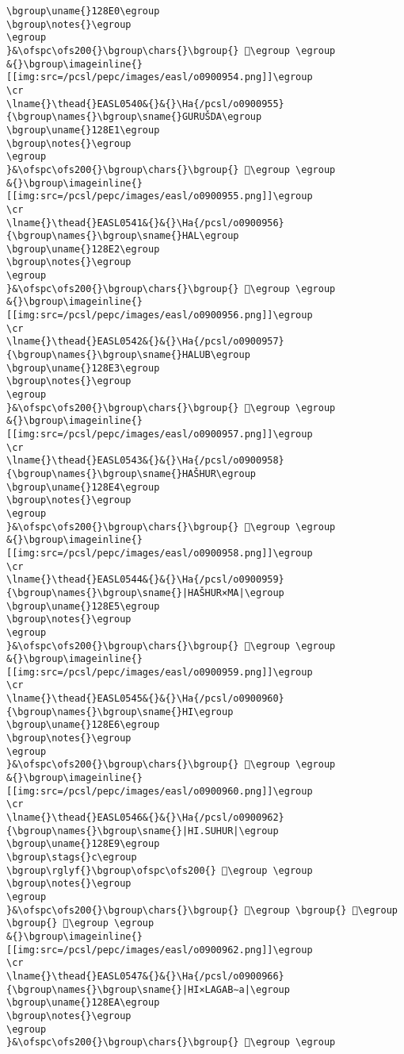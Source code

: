 \begin{verbatim}
\bgroup\uname{}128E0\egroup
\bgroup\notes{}\egroup
\egroup
}&\ofspc\ofs200{}\bgroup\chars{}\bgroup{} 𒣠\egroup \egroup
&{}\bgroup\imageinline{}[[img:src=/pcsl/pepc/images/easl/o0900954.png]]\egroup
\cr
\lname{}\thead{}EASL0540&{}&{}\Ha{/pcsl/o0900955}{\bgroup\names{}\bgroup\sname{}GURUŠDA\egroup
\bgroup\uname{}128E1\egroup
\bgroup\notes{}\egroup
\egroup
}&\ofspc\ofs200{}\bgroup\chars{}\bgroup{} 𒣡\egroup \egroup
&{}\bgroup\imageinline{}[[img:src=/pcsl/pepc/images/easl/o0900955.png]]\egroup
\cr
\lname{}\thead{}EASL0541&{}&{}\Ha{/pcsl/o0900956}{\bgroup\names{}\bgroup\sname{}HAL\egroup
\bgroup\uname{}128E2\egroup
\bgroup\notes{}\egroup
\egroup
}&\ofspc\ofs200{}\bgroup\chars{}\bgroup{} 𒣢\egroup \egroup
&{}\bgroup\imageinline{}[[img:src=/pcsl/pepc/images/easl/o0900956.png]]\egroup
\cr
\lname{}\thead{}EASL0542&{}&{}\Ha{/pcsl/o0900957}{\bgroup\names{}\bgroup\sname{}HALUB\egroup
\bgroup\uname{}128E3\egroup
\bgroup\notes{}\egroup
\egroup
}&\ofspc\ofs200{}\bgroup\chars{}\bgroup{} 𒣣\egroup \egroup
&{}\bgroup\imageinline{}[[img:src=/pcsl/pepc/images/easl/o0900957.png]]\egroup
\cr
\lname{}\thead{}EASL0543&{}&{}\Ha{/pcsl/o0900958}{\bgroup\names{}\bgroup\sname{}HAŠHUR\egroup
\bgroup\uname{}128E4\egroup
\bgroup\notes{}\egroup
\egroup
}&\ofspc\ofs200{}\bgroup\chars{}\bgroup{} 𒣤\egroup \egroup
&{}\bgroup\imageinline{}[[img:src=/pcsl/pepc/images/easl/o0900958.png]]\egroup
\cr
\lname{}\thead{}EASL0544&{}&{}\Ha{/pcsl/o0900959}{\bgroup\names{}\bgroup\sname{}|HAŠHUR×MA|\egroup
\bgroup\uname{}128E5\egroup
\bgroup\notes{}\egroup
\egroup
}&\ofspc\ofs200{}\bgroup\chars{}\bgroup{} 𒣥\egroup \egroup
&{}\bgroup\imageinline{}[[img:src=/pcsl/pepc/images/easl/o0900959.png]]\egroup
\cr
\lname{}\thead{}EASL0545&{}&{}\Ha{/pcsl/o0900960}{\bgroup\names{}\bgroup\sname{}HI\egroup
\bgroup\uname{}128E6\egroup
\bgroup\notes{}\egroup
\egroup
}&\ofspc\ofs200{}\bgroup\chars{}\bgroup{} 𒣦\egroup \egroup
&{}\bgroup\imageinline{}[[img:src=/pcsl/pepc/images/easl/o0900960.png]]\egroup
\cr
\lname{}\thead{}EASL0546&{}&{}\Ha{/pcsl/o0900962}{\bgroup\names{}\bgroup\sname{}|HI.SUHUR|\egroup
\bgroup\uname{}128E9\egroup
\bgroup\stags{}c\egroup
\bgroup\rglyf{}\bgroup\ofspc\ofs200{} 𒣩\egroup \egroup
\bgroup\notes{}\egroup
\egroup
}&\ofspc\ofs200{}\bgroup\chars{}\bgroup{} 𒣧\egroup \bgroup{} 𒣨\egroup \bgroup{} 𒣩\egroup \egroup
&{}\bgroup\imageinline{}[[img:src=/pcsl/pepc/images/easl/o0900962.png]]\egroup
\cr
\lname{}\thead{}EASL0547&{}&{}\Ha{/pcsl/o0900966}{\bgroup\names{}\bgroup\sname{}|HI×LAGAB∼a|\egroup
\bgroup\uname{}128EA\egroup
\bgroup\notes{}\egroup
\egroup
}&\ofspc\ofs200{}\bgroup\chars{}\bgroup{} 𒣪\egroup \egroup

\end{verbatim}
